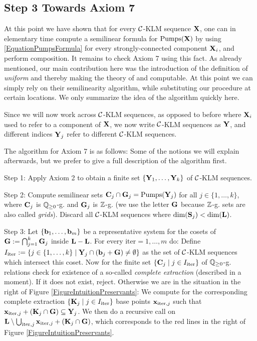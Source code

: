 \subsection{Step 3 Towards Axiom 7}

At this point we have shown that for every \(\mathcal{C}\)-KLM sequence \(\mathbf{X}\), one can in elementary time compute a semilinear formula for \(\operatorname{Pumps}(\mathbf{X})\) by using \eqref{EquationPumpsFormula} for every strongly-connected component \(\mathbf{X}_i\), and perform composition. It remains to check Axiom 7 using this fact. As already mentioned, our main contribution here was the introduction of the definition of \emph{uniform} and thereby making the theory of \cite{Leroux13} and \cite{GuttenbergRE23} computable. At this point we can simply rely on their semilinearity algorithm, while substituting our procedure at certain locations. We only summarize the idea of the algorithm quickly here. 

Since we will now work across \(\mathcal{C}\)-KLM sequences, as opposed to before where \(\mathbf{X}_i\) used to refer to a component of \(\mathbf{X}\), we now write \(\mathcal{C}\)-KLM sequences as \(\mathbf{Y}\), and different indices \(\mathbf{Y}_j\) refer to different \(\mathcal{C}\)-KLM sequences.

The algorithm for Axiom 7 is as follows: Some of the notions we will explain afterwards, but we prefer to give a full description of the algorithm first.

Step 1: Apply Axiom 2 to obtain a finite set \(\{\mathbf{Y}_1, \dots, \mathbf{Y}_k\}\) of \(\mathcal{C}\)-KLM sequences. 

Step 2: Compute semilinear sets \(\mathbf{C}_j \cap \mathbf{G}_j=\operatorname{Pumps}(\mathbf{Y}_j)\) for all \(j \in \{1,\dots, k\}\), where \(\mathbf{C}_j\) is \(\mathbb{Q}_{\geq 0}\)-g. and \(\mathbf{G}_j\) is \(\mathbb{Z}\)-g. (we use the letter \(\mathbf{G}\) because \(\mathbb{Z}\)-g. sets are also called \emph{grids}). Discard all \(\mathcal{C}\)-KLM sequences where \(\dim(\mathbf{S}_j)< \dim(\mathbf{L})\).

Step 3: Let \(\{\mathbf{b}_1, \dots, \mathbf{b}_m\}\) be a representative system for the cosets of \(\mathbf{G}:=\bigcap_{j=1}^k \mathbf{G}_j\) inside \(\mathbf{L}-\mathbf{L}\). For every \(\text{iter}=1, \dots, m\) do: Define \(I_{\text{iter}}:=\{j \in \{1,\dots, k\} \mid \mathbf{Y}_j \cap (\mathbf{b}_j+ \mathbf{G}) \neq \emptyset\}\) as the set of \(\mathcal{C}\)-KLM sequences which intersect this coset. Now for the finite set \(\{\mathbf{C}_j \mid j \in I_{\text{iter}}\}\) of \(\mathbb{Q}_{\geq 0}\)-g. relations check for existence of a so-called \emph{complete extraction} (described in a moment). If it does not exist, reject. Otherwise we are in the situation in the right of Figure \ref{FigureIntuitionPreservants}: We compute for the corresponding complete extraction \(\{\mathbf{K}_j \mid j \in I_{\text{iter}}\}\) base points \(\mathbf{x}_{\text{iter},j}\) such that \(\mathbf{x}_{\text{iter}, j}+(\mathbf{K}_j \cap \mathbf{G}) \subseteq \mathbf{Y}_j\). We then do a recursive call on \(\mathbf{L} \setminus \bigcup_{\text{iter}, j} \mathbf{x}_{\text{iter},j}+(\mathbf{K}_j \cap \mathbf{G})\), which corresponds to the red lines in the right of Figure \ref{FigureIntuitionPreservants}.

